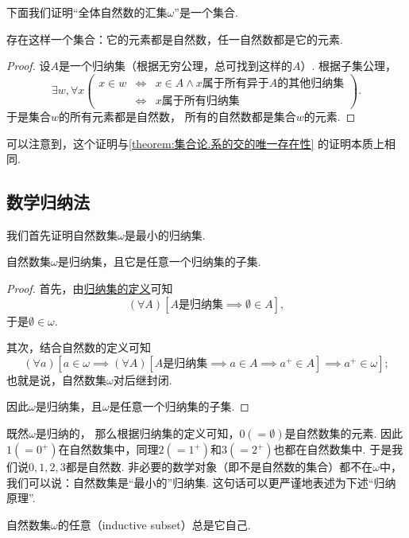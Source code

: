 下面我们证明“全体自然数的汇集\(\omega\)”是一个集合.
\begin{theorem}\label{theorem:集合论.自然数集存在定理}
存在这样一个集合：它的元素都是自然数，任一自然数都是它的元素.
\begin{proof}
设\(A\)是一个归纳集（根据无穷公理，总可找到这样的\(A\)）.
根据子集公理，%
\[
	\exists w,
	\forall x
	\left(
		\begin{array}{rcl}
			x \in w
			&\iff&
				x \in A \land \text{\(x\)属于所有异于\(A\)的其他归纳集} \\
			&\iff&
				\text{\(x\)属于所有归纳集}
		\end{array}
	\right).
\]
于是集合\(w\)的所有元素都是自然数，
所有的自然数都是集合\(w\)的元素.
\end{proof}
\end{theorem}
可以注意到，这个证明与\cref{theorem:集合论.系的交的唯一存在性} 的证明本质上相同.

\subsection{数学归纳法}
我们首先证明自然数集\(\omega\)是最小的归纳集.
\begin{theorem}
自然数集\(\omega\)是归纳集，且它是任意一个归纳集的子集.
\begin{proof}
首先，由\hyperref[definition:集合论.归纳集的定义]{归纳集的定义}可知\[
	(\forall A)[\text{\(A\)是归纳集} \implies \emptyset \in A],
\]
于是\(\emptyset \in \omega\).

其次，结合自然数的定义可知\[
	(\forall a)[
		a \in \omega
		\implies
		(\forall A)[
			\text{\(A\)是归纳集} \implies a \in A \implies a^+ \in A
		]
		\implies
		a^+ \in \omega
	];
\]
也就是说，自然数集\(\omega\)对后继封闭.

因此\(\omega\)是归纳集，且\(\omega\)是任意一个归纳集的子集.
\end{proof}
\end{theorem}

既然\(\omega\)是归纳的，
那么根据归纳集的定义可知，\(0(=\emptyset)\)是自然数集的元素.
因此\(1(=0^+)\)在自然数集中，同理\(2(=1^+)\)和\(3(=2^+)\)也都在自然数集中.
于是我们说\(0,1,2,3\)都是自然数.
非必要的数学对象（即不是自然数的集合）都不在\(\omega\)中，
我们可以说：自然数集是“最小的”归纳集.
这句话可以更严谨地表述为下述“归纳原理”.
\begin{theorem}[归纳原理]\label{theorem:集合论.归纳原理1}
自然数集\(\omega\)的任意（{\rm inductive subset}）总是它自己.
\end{theorem}


